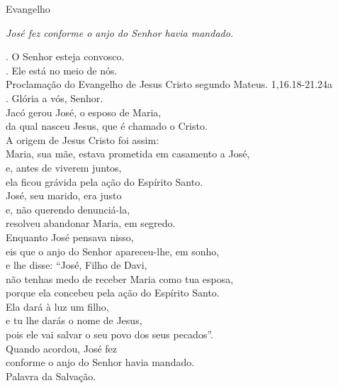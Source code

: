\documentclass{book}
\begin{document}
\begin{center}
    \textcolor{VioletRed2}{Evangelho}
\end{center}
\begin{flushright}
    \textit{José fez conforme o anjo do Senhor havia mandado.}
\end{flushright}
\begin{flushleft}
    {\color{VioletRed2} \Vbar.} O Senhor esteja convosco. \\
    {\color{VioletRed2} \Rbar.} Ele está no meio de nós. \\
    {\color{VioletRed2} \grecross} Proclamação do Evangelho de Jesus Cristo segundo Mateus.
    \hspace{\fill}
    \textcolor{VioletRed2}{1,16.18-21.24a} \\
    {\color{VioletRed2} \Rbar.} Glória a vós, Senhor.
    \vspace{.2cm} \\
    Jacó gerou José, o esposo de Maria, \\
    da qual nasceu Jesus, que é chamado o Cristo. \\
    A origem de Jesus Cristo foi assim: \\
    Maria, sua mãe, estava prometida em casamento a José, \\
    e, antes de viverem juntos, \\
    ela ficou grávida pela ação do Espírito Santo. \\
    José, seu marido, era justo \\
    e, não querendo denunciá-la, \\
    resolveu abandonar Maria, em segredo. \\
    Enquanto José pensava nisso, \\
    eis que o anjo do Senhor apareceu-lhe, em sonho, \\
    e lhe disse: ``José, Filho de Davi, \\
    não tenhas medo de receber Maria como tua esposa, \\
    porque ela concebeu pela ação do Espírito Santo. \\
    Ela dará à luz um filho, \\
    e tu lhe darás o nome de Jesus, \\
    pois ele vai salvar o seu povo dos seus pecados''. \\
    Quando acordou, José fez \\
    conforme o anjo do Senhor havia mandado. \\
    Palavra da Salvação.

\end{flushleft}
\end{document}
